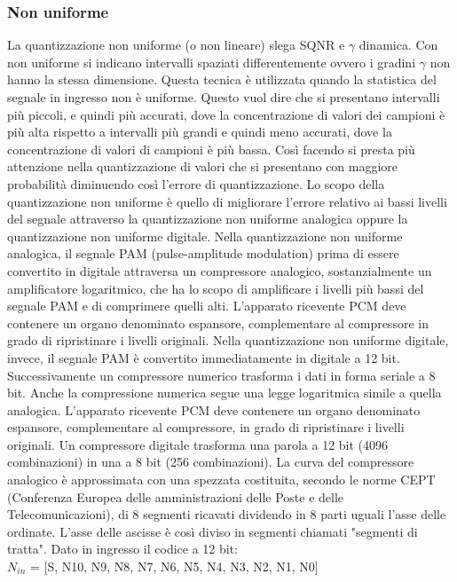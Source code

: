 \documentclass[a4paper]{report} %
\begin{document}
\subsubsection{Non uniforme}
La quantizzazione non uniforme (o non lineare) slega SQNR e $\gamma$ dinamica. Con non uniforme si indicano intervalli spaziati differentemente ovvero i gradini $\gamma$ non hanno la stessa dimensione. Questa tecnica è utilizzata quando la statistica del segnale in ingresso non è uniforme. Questo vuol dire che si presentano intervalli più piccoli, e quindi più accurati, dove la concentrazione di valori dei campioni è più alta rispetto a intervalli più grandi e quindi meno accurati, dove la concentrazione di valori di campioni è più bassa. Così facendo si presta più attenzione nella quantizzazione di valori che si presentano con maggiore probabilità diminuendo così l'errore di quantizzazione. Lo scopo della quantizzazione non uniforme è quello di migliorare l'errore relativo ai bassi livelli del segnale attraverso la quantizzazione non uniforme analogica oppure la quantizzazione non uniforme digitale. 
Nella quantizzazione non uniforme analogica, il segnale PAM (pulse-amplitude modulation) prima di essere convertito in digitale attraversa un compressore analogico, sostanzialmente un amplificatore logaritmico, che ha lo scopo di amplificare i livelli più bassi del segnale PAM e di comprimere quelli alti. L'apparato ricevente PCM deve contenere un organo denominato espansore, complementare al compressore in grado di ripristinare i livelli originali.
Nella quantizzazione non uniforme digitale, invece, il segnale PAM è convertito immediatamente in digitale a 12 bit. Successivamente un compressore numerico trasforma i dati in forma seriale a 8 bit. Anche la compressione numerica segue una legge logaritmica simile a quella analogica. L'apparato ricevente PCM deve contenere un organo denominato espansore, complementare al compressore, in grado di ripristinare i livelli originali. Un compressore digitale trasforma una parola a 12 bit (4096 combinazioni) in una a 8 bit (256 combinazioni). La curva del compressore analogico è approssimata con una spezzata costituita, secondo le norme CEPT (Conferenza Europea delle amministrazioni delle Poste e delle Telecomunicazioni), di 8 segmenti ricavati dividendo in 8 parti uguali l'asse delle ordinate. L'asse delle ascisse è così diviso in segmenti chiamati "segmenti di tratta". Dato in ingresso il codice a 12 bit: \\
$N_{in}$ = [S, N10, N9, N8, N7, N6, N5, N4, N3, N2, N1, N0] \\
\end{document}
